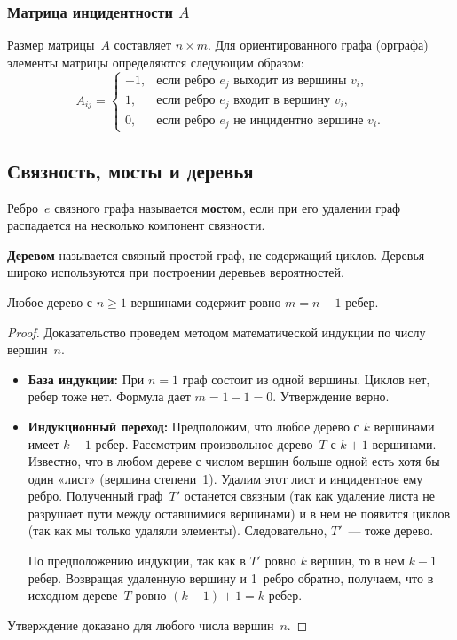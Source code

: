 \subsubsection{Матрица инцидентности \texorpdfstring{$A$}{A}}
Размер матрицы~$A$ составляет $n \times m$. Для ориентированного графа (орграфа) элементы матрицы определяются следующим образом:
\[
A_{ij} = \begin{cases} -1, & \text{если ребро } e_j \text{ выходит из вершины } v_i, \\ 1, & \text{если ребро } e_j \text{ входит в вершину } v_i, \\ 0, & \text{если ребро } e_j \text{ не инцидентно вершине } v_i. \end{cases}
\]

\subsection{Связность, мосты и деревья}

\begin{definition}
Ребро~$e$ связного графа называется \textbf{мостом}, если при его удалении граф распадается на несколько компонент связности.
\end{definition}

\begin{definition}
\textbf{Деревом} называется связный простой граф, не содержащий циклов. Деревья широко используются при построении деревьев вероятностей.
\end{definition}

\begin{theorem}
Любое дерево с $n \ge 1$ вершинами содержит ровно $m = n - 1$ ребер.
\end{theorem}

\begin{proof}
Доказательство проведем методом математической индукции по числу вершин~$n$.
\begin{itemize}
\item \textbf{База индукции:} При $n = 1$ граф состоит из одной вершины. Циклов нет, ребер тоже нет. Формула дает $m = 1 - 1 = 0$. Утверждение верно.
\item \textbf{Индукционный переход:} Предположим, что любое дерево с $k$ вершинами имеет $k - 1$ ребер. Рассмотрим произвольное дерево~$T$ с $k + 1$ вершинами. Известно, что в любом дереве с числом вершин больше одной есть хотя бы один «лист» (вершина степени~1). Удалим этот лист и инцидентное ему ребро. Полученный граф~$T'$ останется связным (так как удаление листа не разрушает пути между оставшимися вершинами) и в нем не появится циклов (так как мы только удаляли элементы). Следовательно, $T'$~--- тоже дерево.

По предположению индукции, так как в $T'$ ровно $k$ вершин, то в нем $k - 1$ ребер. Возвращая удаленную вершину и 1~ребро обратно, получаем, что в исходном дереве~$T$ ровно $(k - 1) + 1 = k$ ребер.
\end{itemize}
Утверждение доказано для любого числа вершин~$n$.
\end{proof}

